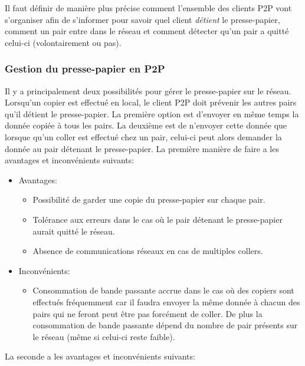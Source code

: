 Il faut définir de manière plus précise comment l'ensemble des clients P2P
vont s'organiser afin de s'informer pour savoir quel client \emph{détient} le
presse-papier, comment un pair entre dans le réseau et comment détecter
qu'un pair a quitté celui-ci (volontairement ou pas).

\subsubsection{Gestion du presse-papier en P2P}
Il y a principalement deux possibilités pour gérer le presse-papier
sur le réseau. Lorsqu'un copier est effectué en local, le client P2P
doit prévenir les autres pairs qu'il détient le presse-papier.
La première option est d'envoyer en même temps la donnée copiée à tous les
pairs. La deuxième est de n'envoyer cette donnée que lorsque qu'un coller
est effectué chez un pair, celui-ci peut alors demander la donnée au pair
détenant le presse-papier.
La première manière de faire a les avantages et inconvénients suivants:
\begin{itemize}
\item Avantages:
  \begin{itemize}
  \item Possibilité de garder une copie du presse-papier sur chaque pair.
  \item Tolérance aux erreurs dans le cas où le pair détenant le presse-papier
    aurait quitté le réseau.
  \item Absence de communications réseaux en cas de multiples collers.
  \end{itemize}
\item Inconvénients:
  \begin{itemize}
  \item Consommation de bande passante accrue dans le cas où des copiers
    sont effectués fréquemment car il faudra envoyer la même donnée à chacun
    des pairs qui ne feront peut être pas forcément de coller. De plus la
    consommation de bande passante dépend du nombre de pair présents sur le
    réseau (même si celui-ci reste faible).
  \end{itemize}
\end{itemize}
La seconde a les avantages et inconvénients suivants:
